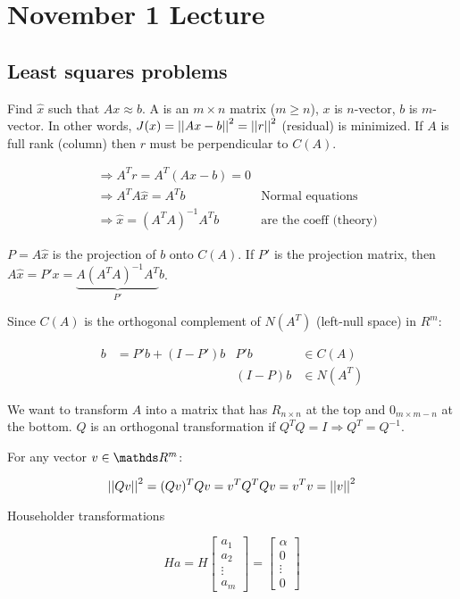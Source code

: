 \section{November 1 Lecture}

\subsection{Least squares problems}
Find $\hat{x}$ such that $Ax \approx b$. A is an $m \times n$ matrix ($m \geq n$), $x$ is $n$-vector, $b$ is $m$-vector. In other words, $J(x) = \left|\left|Ax - b\right|\right|^2 = \left|\left|r\right|\right|^2$ (residual) is minimized. If $A$ is full rank (column) then $r$ must be perpendicular to $C(A)$.

\begin{align*}
  &\Rightarrow A^Tr = A^T(Ax-b) = 0\\
  &\Rightarrow A^TA\hat{x} = A^Tb &\text{Normal equations}\\
  &\Rightarrow \hat{x} = (A^T A)^{-1}A^T b &\text{are the coeff (theory)}
\end{align*}

$P = A \hat{x}$ is the projection of $b$ onto $C(A)$. If $P'$ is the projection matrix, then $A\hat{x} = P'x = \underbrace{A(A^TA)^{-1} A^T}_{P'} b$.

Since $C(A)$ is the orthogonal complement of $N(A^T)$ (left-null space) in $R^m$:

\begin{align*}
  b &= P'b+(I-P')b & P'b &\in C(A) \\
  & & (I-P)b &\in N(A^T)
\end{align*}

We want to transform $A$ into a matrix that has $R_{n \times n}$ at the top and $0_{m \times m-n}$ at the bottom. $Q$ is an orthogonal transformation if $Q^TQ = I \Rightarrow Q^T=Q^{-1}$.

For any vector $v \in \bbR^{m}$:

\[
  \left|\left|Qv\right|\right|^2 = (Qv)^T Qv = v^T Q^T Q v = v^T v = \left|\left|v\right|\right|^2
\]

Householder transformations

\[
  Ha = H \begin{bmatrix}
    a_1 \\ a_2 \\ \vdots \\ a_m
  \end{bmatrix}
  =
  \begin{bmatrix}
    \alpha \\ 0 \\ \vdots \\ 0
  \end{bmatrix}
\]

